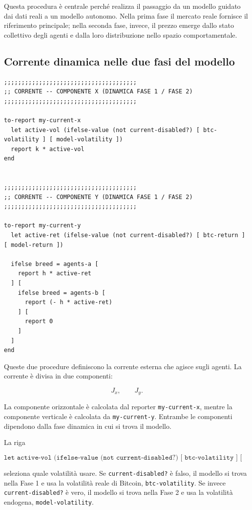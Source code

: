 Questa procedura è centrale perché realizza il passaggio da un modello guidato
dai dati reali a un modello autonomo. Nella prima fase il mercato reale fornisce
il riferimento principale; nella seconda fase, invece, il prezzo emerge dallo
stato collettivo degli agenti e dalla loro distribuzione nello spazio
comportamentale.

\subsection{Corrente dinamica nelle due fasi del modello}

\begin{lstlisting}[caption={Componenti della corrente nelle fasi reale ed endogena}]
;;;;;;;;;;;;;;;;;;;;;;;;;;;;;;;;;;;;;;
;; CORRENTE -- COMPONENTE X (DINAMICA FASE 1 / FASE 2)
;;;;;;;;;;;;;;;;;;;;;;;;;;;;;;;;;;;;;;

to-report my-current-x
  let active-vol (ifelse-value (not current-disabled?) [ btc-volatility ] [ model-volatility ])
  report k * active-vol
end


;;;;;;;;;;;;;;;;;;;;;;;;;;;;;;;;;;;;;;
;; CORRENTE -- COMPONENTE Y (DINAMICA FASE 1 / FASE 2)
;;;;;;;;;;;;;;;;;;;;;;;;;;;;;;;;;;;;;;

to-report my-current-y
  let active-ret (ifelse-value (not current-disabled?) [ btc-return ] [ model-return ])

  ifelse breed = agents-a [
    report h * active-ret
  ] [
    ifelse breed = agents-b [
      report (- h * active-ret)
    ] [
      report 0
    ]
  ]
end
\end{lstlisting}

Queste due procedure definiscono la corrente esterna che agisce sugli agenti.
La corrente è divisa in due componenti:

\[
J_x,
\qquad
J_y.
\]

La componente orizzontale è calcolata dal reporter \texttt{my-current-x}, mentre
la componente verticale è calcolata da \texttt{my-current-y}. Entrambe le
componenti dipendono dalla fase dinamica in cui si trova il modello.

La riga

\[
\texttt{let active-vol (ifelse-value (not current-disabled?) [ btc-volatility ] [ model-volatility ])}
\]

seleziona quale volatilità usare. Se \texttt{current-disabled?} è falso, il
modello si trova nella Fase 1 e usa la volatilità reale di Bitcoin,
\texttt{btc-volatility}. Se invece \texttt{current-disabled?} è vero, il modello
si trova nella Fase 2 e usa la volatilità endogena, \texttt{model-volatility}.

